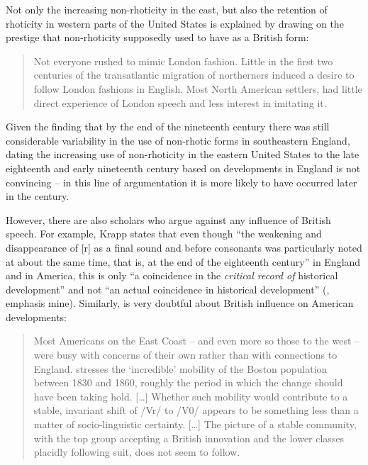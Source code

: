Not only the increasing non-rhoticity in the east, but also the retention of rhoticity in western parts of the United States is explained by drawing on the prestige that non-rhoticity supposedly used to have as a British form:


\begin{quote}
Not everyone rushed to mimic London fashion. Little in the first two centuries of the transatlantic migration of northerners induced a desire to follow London fashions in English. Most North American settlers, had little direct experience of London speech and less interest in imitating it. \citep[107]{Bailey1996}
\end{quote}


Given the finding that by the end of the nineteenth century there was still considerable variability in the use of non-rhotic forms in southeastern England, dating the increasing use of non-rhoticity in the eastern United States to the late eighteenth and early nineteenth century based on developments in England is not convincing – in this line of argumentation it is more likely to have occurred later in the century.


However, there are also scholars who argue against any influence of British speech. For example, Krapp states that even though “the weakening and disappearance of [r] as a final sound and before consonants was particularly noted at about the same time, that is, at the end of the eighteenth century” in England and in America, this is only “a coincidence in the \emph{critical record of} historical development” and not “an actual coincidence in historical development” (\citealt[227]{Krapp19252}, emphasis mine). Similarly, \citet[49--50]{Dillard1992} is very doubtful about British influence on American developments:

\begin{quote}
Most Americans on the East Coast – and even more so those to the west – were busy with concerns of their own rather than with connections to England. \citet{Knights1969} stresses the ‘incredible’ mobility of the Boston population between 1830 and 1860, roughly the period in which the change should have been taking hold. […] Whether such mobility would contribute to a stable, invariant shift of /Vr/ to /V0/ appears to be something less than a matter of socio-linguistic certainty. […] The picture of a stable community, with the top group accepting a British innovation and the lower classes placidly following suit, does not seem to follow.
\end{quote}

